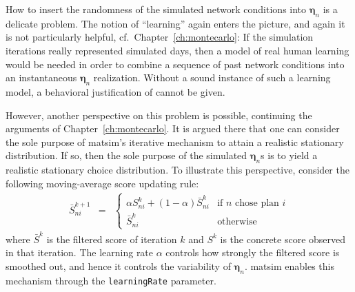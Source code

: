 %
How to insert the randomness of the simulated network conditions into
$\boldsymbol{\eta}_n$ is a delicate problem.
%
%
The notion of {}``learning'' again
enters the picture, and again it is not particularly helpful, cf.~Chapter~\ref{ch:montecarlo}: If the simulation iterations really represented
simulated days, then a model of real human learning would be needed in
order to combine a sequence of past network conditions into an instantaneous
$\boldsymbol{\eta}_n$ realization. Without a sound instance of such a learning model,
a behavioral justification of  cannot
be given.

However, another perspective on this problem is possible, continuing
the arguments of Chapter~\ref{ch:montecarlo}. It is argued there that one can consider
the sole purpose of \gls{matsim}'s iterative mechanism to attain a realistic
stationary distribution. If so, then the sole purpose of the simulated
$\boldsymbol{\eta}_n$s is to yield a realistic stationary choice distribution. To
illustrate this perspective, consider the following moving-average score
updating rule:
\begin{eqnarray}
\bar{S}_{ni}^{k+1} & = & \begin{cases}
\alpha S_{ni}^{k} + (1 - \alpha)\bar{S}_{ni}^{k} & \text{if }n\text{ chose plan }i\\
\bar{S}_{ni}^{k} & \text{otherwise}
\end{cases}
\end{eqnarray}
where $\bar{S}^{k}$ is the filtered score of iteration $k$ and $S^{k}$
is the concrete score observed in that iteration. The learning rate $\alpha$
controls how strongly the filtered score is smoothed out, and hence
it controls the variability of $\boldsymbol{\eta}_n$. \gls{matsim} enables this mechanism
through the \lstinline{learningRate} parameter.
%

